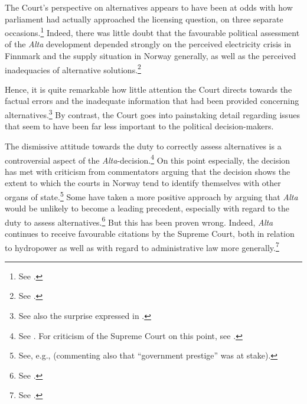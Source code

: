 The Court's perspective on alternatives appears to have been at odds with how parliament had actually approached the licensing question, on three separate occasions.\footnote{See \cite[342]{alta82}.} Indeed, there was little doubt that the favourable political assessment of the {\it Alta} development depended strongly on the perceived electricity crisis in Finnmark and the supply situation in Norway generally, as well as the perceived inadequacies of alternative solutions.\footnote{See \cite[338-347]{alta82}.}



Hence, it is quite remarkable how little attention the Court directs towards the factual errors and the inadequate information that had been provided concerning alternatives.\footnote{See also the surprise expressed in \cite[349-351]{eckhoff82}.} By contrast, the Court goes into painstaking detail regarding issues that seem to have been far less important to the political decision-makers.

The dismissive attitude towards the duty to correctly assess alternatives is a controversial aspect of the {\it Alta}-decision.\footnote{See \cite[311]{haagensen02}. For criticism of the Supreme Court on this point, see \cite[580-584]{backer86}.} On this point especially, the decision has met with criticism from commentators arguing that the decision shows the extent to which the courts in Norway tend to identify themselves with other organs of state.\footnote{See, e.g., \cite[64]{graver88} (commenting also that ``government prestige'' was at stake).} Some have taken a more positive approach by arguing that {\it Alta} would be unlikely to become a leading precedent, especially with regard to the duty to assess alternatives.\footnote{See \cite[580-584]{backer86}.} But this has been proven wrong. Indeed, {\it Alta} continues to receive favourable citations by the Supreme Court, both in relation to hydropower as well as with regard to administrative law more generally.\footnote{See \cite{ambassade09,jorpeland11}.}

